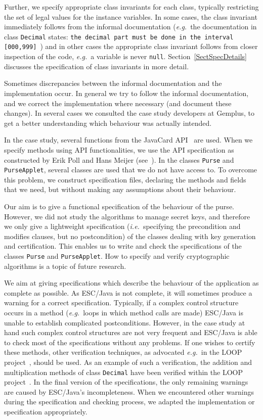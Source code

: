 \documentclass[a4paper]{llncs}
\begin{document}
Further, we specify appropriate class invariants for each class,
typically restricting the set of legal values for the instance
variables. In some cases, the class invariant immediately follows from
the informal documentation (\emph{e.g.}~the documentation in class
\texttt{Decimal} states:
\texttt{the decimal part must be done in the interval 
[000,999]}~\cite{PurseUrl})
and in other cases the appropriate class
invariant follows from closer inspection of the code, \emph{e.g.}~a
variable is never \texttt{null}.  Section~\ref{SectSpecDetails}
discusses the specification of class invariants in more detail.

Sometimes discrepancies between the informal documentation and the
implementation occur. In general we try to follow the informal
documentation, and we correct the implementation where necessary
(and document these changes). In several cases we consulted the case
study developers at Gemplus, to get a better understanding which
behaviour was actually intended.

In the case study, several functions from the JavaCard
API~\cite{JavaCardAPI} are used. When we specify methods using API
functionalities, we use the API specification as constructed by Erik
Poll and Hans Meijer (see~\cite{LoopAPIURL,MeijerP01}).  In the
classes \texttt{Purse} and \texttt{PurseApplet}, several classes are
used that we do not have access to. To overcome this problem, we
construct specification files, declaring the methods and fields that we need,
but without making any assumptions about their behaviour.

Our aim is to give a functional specification of the behaviour of the
purse. However, we did not study the algorithms to manage secret keys,
and therefore we only give a lightweight specification
(\emph{i.e.}~specifying the precondition and modifies clauses, but no
postcondition) of the classes dealing with key generation and
certification. This enables us to write and check the specifications of
the classes \texttt{Purse} and \texttt{PurseApplet}. How to specify
and verify cryptographic algorithms is a topic of future research.


We aim at giving specifications which describe the behaviour of the
application as complete as possible. As ESC/Java is not complete, it
will sometimes produce a warning for a correct specification.
Typically, if a complex control structure occurs in a method
(\emph{e.g.}~loops in which method calls are made) ESC/Java is unable
to establish complicated postconditions. However, in the case study at
hand such complex control structures are not very frequent and
ESC/Java is able to check most of the specifications without any
problems. If one wishes to certify these methods, other verification
techniques, as advocated
\emph{e.g.}~in the LOOP project~\cite{LOOPUrl}, should be
used. As an example of such a verification, the addition and
multiplication methods of class \texttt{Decimal} have been verified
within the LOOP project~\cite{BreunesseJB02}.  In the final version of
the specifications, the only remaining warnings are caused by
ESC/Java's incompleteness. When we encountered other warnings during
the specification and checking process, we adapted the implementation
or specification appropriately.
\end{document}
